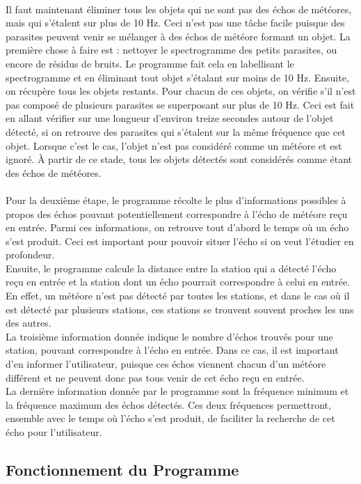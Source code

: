 \documentclass[11pt]{article}
\begin{document}
\\
Il faut maintenant éliminer tous les objets qui ne sont pas des échos de météores, mais qui s'étalent sur plus de 10 Hz.
Ceci n'est pas une tâche facile puisque des parasites peuvent venir se mélanger à des échos de météore formant un objet.
La première chose à faire est : nettoyer le spectrogramme des petits parasites, ou encore de résidus de bruits.
Le programme fait cela en labellisant le spectrogramme et en éliminant tout objet s'étalant sur moins de 10 Hz.
Ensuite, on récupère tous les objets restants.
Pour chacun de ces objets, on vérifie s'il n'est pas composé de plusieurs parasites se superposant sur plus de 10 Hz.
Ceci est fait en allant vérifier sur une longueur d'environ treize secondes autour de l'objet détecté, si on retrouve des parasites qui s'étalent sur la même fréquence que cet objet.
Lorsque c'est le cas, l'objet n'est pas considéré comme un météore et est ignoré.
À partir de ce stade, tous les objets détectés sont considérés comme étant des échos de météores.\\
\\
Pour la deuxième étape, le programme récolte le plus d'informations possibles à propos des échos pouvant potentiellement correspondre à l'écho de météore reçu en entrée.
Parmi ces informations, on retrouve tout d'abord le temps où un écho s'est produit.
Ceci est important pour pouvoir situer l'écho si on veut l'étudier en profondeur.\\
Ensuite, le programme calcule la distance entre la station qui a détecté l'écho reçu en entrée et la station dont un écho pourrait correspondre à celui en entrée.
En effet, un météore n'est pas détecté par toutes les stations, et dans le cas où il est détecté par plusieurs stations, ces stations se trouvent souvent proches les uns des autres.\\
La troisième information donnée indique le nombre d'échos trouvés pour une station, pouvant correspondre à l'écho en entrée.
Dans ce cas, il est important d'en informer l'utilisateur, puisque ces échos viennent chacun d'un météore différent et ne peuvent donc pas tous venir de cet écho reçu en entrée.\\
La dernière information donnée par le programme sont la fréquence minimum et la fréquence maximum des échos détectés.
Ces deux fréquences permettront, ensemble avec le temps où l'écho s'est produit, de faciliter la recherche de cet écho pour l'utilisateur.

\subsection{Fonctionnement du Programme}
\end{document}
